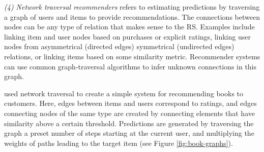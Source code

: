 \vspace{2em}

\noindent
\emph{(4) Network traversal recommenders} refers to estimating predictions by traversing a graph of users and items to provide recommendations.
The connections between nodes can be any type of relation that makes sense to the RS. Examples include linking item and user nodes
based on purchases or explicit ratings, linking user nodes from asymmetrical (directed edges) symmetrical (undirected edges) relations,
or linking items based on some similarity metric.
Recommender systems can use common graph-traversal algorithms to infer unknown connections in this graph.

\cite{Huang2002} used network traversal to create a simple system for recommending books to customers.
Here, edges between items and users correspond to ratings, and edges connecting nodes of the same type
are created by connecting elements that have similarity above a certain threshold. Predictions are generated
by traversing the graph a preset number of steps starting at the current user, and multiplying the weights
of paths leading to the target item (see Figure \ref{fig:book-graphs}).

